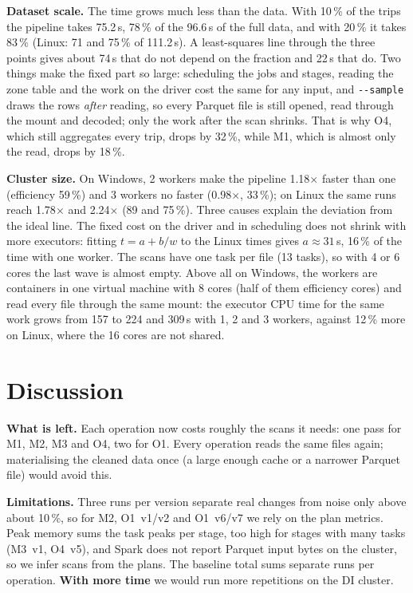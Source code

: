 \documentclass[sigconf]{acmart}
\begin{document}
\textbf{Dataset scale.} The time grows much less than the data. With 10\,\% of the trips the pipeline takes 75.2\,s, 78\,\% of the 96.6\,s of the full data, and with 20\,\% it takes 83\,\% (Linux: 71 and 75\,\% of 111.2\,s). A least-squares line through the three points gives about 74\,s that do not depend on the fraction and 22\,s that do. Two things make the fixed part so large: scheduling the jobs and stages, reading the zone table and the work on the driver cost the same for any input, and \texttt{-{}-sample} draws the rows \emph{after} reading, so every Parquet file is still opened, read through the mount and decoded; only the work after the scan shrinks. That is why O4, which still aggregates every trip, drops by 32\,\%, while M1, which is almost only the read, drops by 18\,\%.

\textbf{Cluster size.} On Windows, 2 workers make the pipeline 1.18$\times$ faster than one (efficiency 59\,\%) and 3 workers no faster (0.98$\times$, 33\,\%); on Linux the same runs reach 1.78$\times$ and 2.24$\times$ (89 and 75\,\%). Three causes explain the deviation from the ideal line. The fixed cost on the driver and in scheduling does not shrink with more executors: fitting $t = a + b/w$ to the Linux times gives $a \approx 31$\,s, 16\,\% of the time with one worker. The scans have one task per file (13 tasks), so with 4 or 6 cores the last wave is almost empty. Above all on Windows, the workers are containers in one virtual machine with 8 cores (half of them efficiency cores) and read every file through the same mount: the executor CPU time for the same work grows from 157 to 224 and 309\,s with 1, 2 and 3 workers, against 12\,\% more on Linux, where the 16 cores are not shared.


\section{Discussion}
\textbf{What is left.} Each operation now costs roughly the scans it needs: one pass for M1, M2, M3 and O4, two for O1.  Every operation reads the same files again; materialising the cleaned data
once (a large enough cache or a narrower Parquet file) would avoid this.

\textbf{Limitations.} Three runs per version separate real changes from noise only above about 10\,\%, so for M2, O1~v1/v2 and O1~v6/v7
we rely on the plan metrics. Peak memory sums the task peaks per stage, too high for stages with many tasks (M3~v1, O4~v5), and Spark does not
report Parquet input bytes on the cluster, so we infer scans from the plans. The baseline total sums separate runs per operation. \textbf{With more time} we would run more repetitions on the DI cluster.
\end{document}
